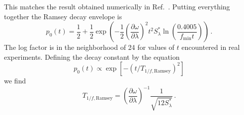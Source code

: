 This matches the result obtained numerically in Ref.~\cite{Martinis:bias_noise:2003}.
Putting everything together the Ramsey decay envelope is
\begin{equation}
  p_0(t)
  = \frac{1}{2} + \frac{1}{2} \exp \left( -\frac{1}{2} \left( \frac{\partial\omega}{\partial\lambda} \right)^2 t^2 S^*_\lambda \ln\left(\frac{0.4005}{f_{\text{min}} t} \right) \right) \, .
\end{equation}
The log factor is in the neighborhood of 24 for values of $t$ encountered in real experiments.
Defining the decay constant by the equation
\begin{equation}
  p_0(t) \propto \exp \left[ - \left( t / T_{1/f,\text{Ramsey}} \right)^2 \right]
\end{equation}
we find
\begin{equation}
  T_{1/f,\text{Ramsey}}
  = \left( \frac{\partial\omega}{\partial\lambda} \right)^{-1} \frac{1}{\sqrt{12 S^*_\lambda}}
  \, .
\end{equation}
